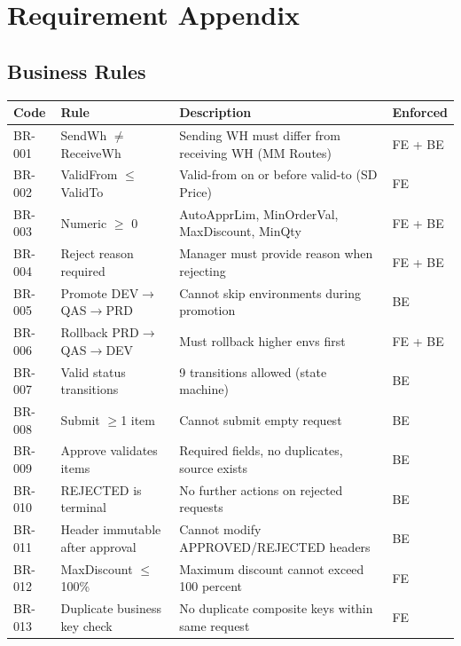 \documentclass[12pt,a4paper]{report}
\begin{document}
\section{Requirement Appendix}

\subsection{Business Rules}

\begin{longtable}{|l|p{3.5cm}|p{5.5cm}|l|}
  \hline
  \rowcolor{tableheadpeach}
  \textbf{Code} & \textbf{Rule} & \textbf{Description} & \textbf{Enforced} \\ \hline
  \endhead \hline \endfoot
  BR-001 & SendWh $\neq$ ReceiveWh       & Sending WH must differ from receiving WH (MM Routes) & FE + BE \\ \hline
  BR-002 & ValidFrom $\leq$ ValidTo       & Valid-from on or before valid-to (SD Price)           & FE \\ \hline
  BR-003 & Numeric $\geq$ 0               & AutoApprLim, MinOrderVal, MaxDiscount, MinQty         & FE + BE \\ \hline
  BR-004 & Reject reason required         & Manager must provide reason when rejecting             & FE + BE \\ \hline
  BR-005 & Promote DEV$\rightarrow$QAS$\rightarrow$PRD & Cannot skip environments during promotion & BE \\ \hline
  BR-006 & Rollback PRD$\rightarrow$QAS$\rightarrow$DEV & Must rollback higher envs first          & FE + BE \\ \hline
  BR-007 & Valid status transitions        & 9 transitions allowed (state machine)                 & BE \\ \hline
  BR-008 & Submit $\geq$1 item             & Cannot submit empty request                           & BE \\ \hline
  BR-009 & Approve validates items         & Required fields, no duplicates, source exists          & BE \\ \hline
  BR-010 & REJECTED is terminal            & No further actions on rejected requests                & BE \\ \hline
  BR-011 & Header immutable after approval & Cannot modify APPROVED/REJECTED headers                & BE \\ \hline
  BR-012 & MaxDiscount $\leq$ 100\%        & Maximum discount cannot exceed 100 percent             & FE \\ \hline
  BR-013 & Duplicate business key check    & No duplicate composite keys within same request        & FE \\ \hline
\end{longtable}
\end{document}
